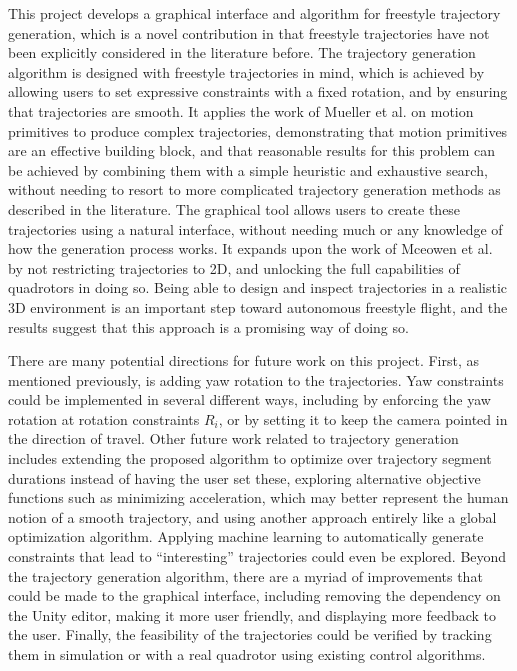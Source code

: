\documentclass[pageno]{jpaper}
\newcommand{\quotes}[1]{``#1''}
\begin{document}
This project develops a graphical interface and algorithm for freestyle trajectory generation, which is a novel contribution in that freestyle trajectories have not been explicitly considered in the literature before. The trajectory generation algorithm is designed with freestyle trajectories in mind, which is achieved by allowing users to set expressive constraints with a fixed rotation, and by ensuring that trajectories are smooth. It applies the work of Mueller et al. on motion primitives to produce complex trajectories, demonstrating that motion primitives are an effective building block, and that reasonable results for this problem can be achieved by combining them with a simple heuristic and exhaustive search, without needing to resort to more complicated trajectory generation methods as described in the literature. The graphical tool allows users to create these trajectories using a natural interface, without needing much or any knowledge of how the generation process works. It expands upon the work of Mceowen et al. by not restricting trajectories to 2D, and unlocking the full capabilities of quadrotors in doing so. Being able to design and inspect trajectories in a realistic 3D environment is an important step toward autonomous freestyle flight, and the results suggest that this approach is a promising way of doing so.

There are many potential directions for future work on this project. First, as mentioned previously, is adding yaw rotation to the trajectories. Yaw constraints could be implemented in several different ways, including by enforcing the yaw rotation at rotation constraints $R_i$, or by setting it to keep the camera pointed in the direction of travel. Other future work related to trajectory generation includes extending the proposed algorithm to optimize over trajectory segment durations instead of having the user set these, exploring alternative objective functions such as minimizing acceleration, which may better represent the human notion of a smooth trajectory, and using another approach entirely like a global optimization algorithm. Applying machine learning to automatically generate constraints that lead to \quotes{interesting} trajectories could even be explored. Beyond the trajectory generation algorithm, there are a myriad of improvements that could be made to the graphical interface, including removing the dependency on the Unity editor, making it more user friendly, and displaying more feedback to the user. Finally, the feasibility of the trajectories could be verified by tracking them in simulation or with a real quadrotor using existing control algorithms.
\end{document}
